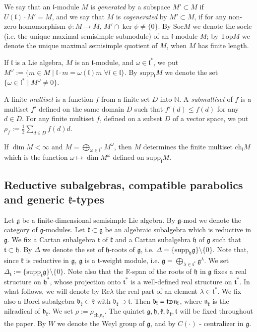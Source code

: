 \documentclass[11pt]{amsart}
\renewcommand{\tt}{\mathfrak{t}}
\newcommand{\kk}{\mathfrak{k}}
\newcommand{\nn}{\mathfrak{n}}
\newcommand{\hh}{\mathfrak{h}}
\renewcommand{\gg}{\mathfrak{g}}
\newcommand{\bb}{\mathfrak{b}}
\renewcommand{\ll}{\mathfrak{l}}
\newcommand{\supp}{\mathrm{supp}}
\newcommand{\ch}{\mathrm{ch}}
\newcommand{\Soc}{\mathrm{Soc}}
\renewcommand{\Top}{\mathrm{Top}}
\newcommand{\field}[1]{\mathbb{#1}}
\def\crplus{\hbox{$\supset${\raise1.05pt\hbox{\kern -0.55em ${\scriptscriptstyle +}$}}\ }}
\begin{document}
We say that an $\ll$-module $M$ is \textit{generated} by a subspace $M'\subset M$ if $U(\ll)\cdot M'=M$, and we say that $M$ is \textit{cogenerated} by $M'\subset M$, if for any non-zero homomorphism $\psi :M\rightarrow\bar{M}$, $M'\cap\ker\psi\neq\{0\}$. By $\Soc M$ we denote the socle (i.e. the unique maximal semisimple submodule) of an $\ll$-module $M$; by $\Top M$ we denote the unique maximal semisimple quotient of $M$, when $M$ has finite length.

If $\ll$ is a Lie algebra, $M$ is an $\ll$-module, and $\omega\in\ll^*$, we put $M^\omega:=\{m\in M\; |\; \ll\cdot m=\omega(\ll)m \;\forall l \in\ll\}$. By $\supp_\ll M$ we denote the set $\{\omega\in\ll^*\; |\; M^\omega\neq 0\}$.

A finite \textit{multiset} is a function $f$ from a finite set $D$ into $\field{N}$. A \textit{submultiset} of $f$ is a multiset $f'$ defined on the same domain $D$ such that $f'(d)\leq f(d)$ for any $d\in D$. For any finite multiset $f$, defined on a subset $D$ of a vector space, we put $\rho_f:=\frac{1}{2}\sum_{d\in D}f(d)d$.

If $\dim M<\infty$ and $M=\bigoplus_{\omega\in\ll^*}M^\omega$, then $M$ determines the finite multiset $\ch_{\ll}M$ which is the function $\omega\mapsto\dim M^\omega$ defined on $\supp_{\ll}M$.

\subsection{Reductive subalgebras, compatible parabolics and generic $\kk$-types}

Let $\gg$ be a finite-dimensional semisimple Lie algebra. By $\gg$-mod we denote the category of $\gg$-modules. Let $\kk\subset\gg$ be an algebraic subalgebra which is reductive in $\gg$. We fix a Cartan subalgebra $\tt$ of $\kk$ and a Cartan subalgebra $\hh$ of $\gg$ such that $\tt\subset\hh$. By $\Delta$ we denote the set of $\hh$-roots of $\gg$, i.e. $\Delta=\{\supp_\hh\gg\}\setminus\{0\}$. Note that, since $\kk$ is reductive in $\gg$, $\gg$ is a $\tt$-weight module, i.e. $\gg=\bigoplus_{\lambda\in\tt^*}\gg^\lambda$. We set $\Delta_\tt:=\{\supp_\tt\gg\}\setminus\{0\}$. Note also that the $\field{R}$-span of the roots of $\hh$ in $\gg$ fixes a real structure on $\hh^*$, whose projection onto $\tt^*$ is a well-defined real structure on $\tt^*$. In what follows, we will denote by $\mathrm{Re}\lambda$ the real part of an element $\lambda\in\tt^*$. We fix also a Borel subalgebra $\bb_\kk\subset\kk$ with $\bb_\kk\supset\tt$. Then $\bb_\kk=\tt\crplus\nn_\kk$, where $\nn_\kk$ is the nilradical of $\bb_\kk$. We 
set $\rho:=\rho_{\ch_\tt\nn_\kk}$. The quintet $\gg,\hh,\kk,\bb_\kk,\tt$ will be fixed throughout the paper. By $W$ we denote the Weyl group of $\gg$, and by $C(\cdot)$ - centralizer in $\gg$.
\end{document}
